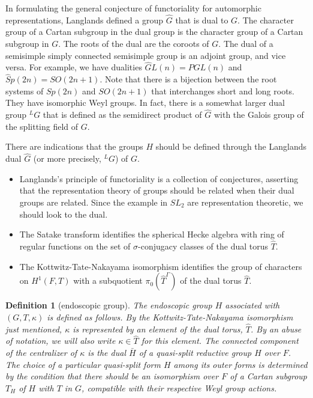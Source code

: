 \documentclass[brochure,english,12pt]{bourbaki}
\newtheorem{definition}[equation]{Definition}
\begin{document}
In formulating the general conjecture of functoriality for automorphic
representations, Langlands defined a group $\hat G$ that is dual to
$G$.  The character group of a Cartan subgroup in the dual group is
the character group of a Cartan subgroup in $G$.  The roots of the
dual are the coroots of $G$.  The dual of a semisimple simply
connected semisimple group is an adjoint group, and vice versa.  For
example, we have dualities $\hat GL(n) = PGL(n)$ and
$\hat Sp(2n)=SO(2n+1)$.  Note that there is a bijection between the
root systems of $Sp(2n)$ and $SO(2n+1)$ that interchanges short and
long roots.  They have isomorphic Weyl groups.  In fact, there is a somewhat larger
dual group ${}^LG$ that is defined as the semidirect product of $\hat G$ with the Galois group of the splitting field of $G$.

There are indications that the groups $H$ should be defined through  
the Langlands dual $\hat G$ (or more precisely, ${}^LG$) of $G$.
\begin{itemize}
\item Langlands's principle of functoriality is a collection of conjectures, asserting that the
  representation theory of groups should be related when their dual
  groups are related.  
  Since the example in $SL_2$ are representation theoretic, we should look to the dual.
\item The Satake transform identifies the spherical Hecke algebra with
  ring of regular functions on the set of $\sigma$-conjugacy classes of the dual torus $\hat T$.
\item The Kottwitz-Tate-Nakayama isomorphism identifies the group of characters on $H^1(F,T)$
with a subquotient $\pi_0(\hat T^\Gamma)$ of the dual torus $\hat T$.
\end{itemize}

\begin{definition}[endoscopic group]
  The endoscopic group $H$ associated with $(G,T,\kappa)$ is defined
  as follows.  By the Kottwitz-Tate-Nakayama isomorphism just
  mentioned, $\kappa$ is represented by an element of the dual torus,
  $\hat T$.  By an abuse of notation, we will also write $\kappa\in
  \hat T$ for this element.  The connected component of the
  centralizer of $\kappa$ is the dual $\bar H$ of a quasi-split
  reductive group $H$ over $F$.  The choice of a particular quasi-split form $H$
  among its outer forms is determined by the condition that there should
  be an isomorphism over $F$ of a Cartan subgroup $T_H$ of $H$ with
  $T$ in $G$, compatible with their respective Weyl group actions.
\end{definition}
\end{document}
